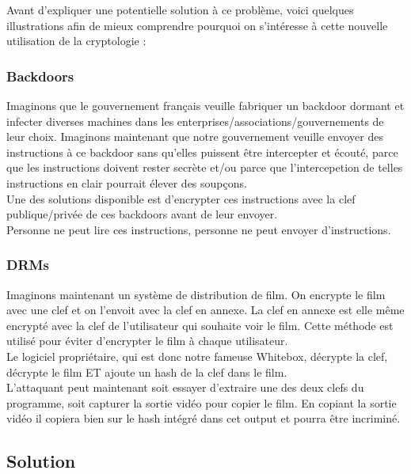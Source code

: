 \documentclass[a4paper,12pt]{article}
\begin{document}
Avant d'expliquer une potentielle solution à ce problème, voici quelques illustrations afin de mieux comprendre pourquoi on s'intéresse à cette nouvelle utilisation de la cryptologie :\\


\subsubsection{Backdoors}

Imaginons que le gouvernement français veuille fabriquer un backdoor dormant et infecter diverses machines dans les enterprises/associations/gouvernements de leur choix. Imaginons maintenant que notre gouvernement veuille envoyer des instructions à ce backdoor sans qu'elles puissent être intercepter et écouté, parce que les instructions doivent rester secrète et/ou parce que l'intercepetion de telles instructions en clair pourrait élever des soupçons.\\

Une des solutions disponible est d'encrypter ces instructions avec la clef publique/privée de ces backdoors avant de leur envoyer.\\

Personne ne peut lire ces instructions, personne ne peut envoyer d'instructions.


\subsubsection{DRMs}

Imaginons maintenant un système de distribution de film. On encrypte le film avec une clef et on l'envoit avec la clef en annexe. La clef en annexe est elle même encrypté avec la clef de l'utilisateur qui souhaite voir le film. Cette méthode est utilisé pour éviter d'encrypter le film à chaque utilisateur.\\
Le logiciel propriétaire, qui est donc notre fameuse Whitebox, décrypte la clef, décrypte le film ET ajoute un hash de la clef dans le film.\\
L'attaquant peut maintenant soit essayer d'extraire une des deux clefs du programme, soit capturer la sortie vidéo pour copier le film. En copiant la sortie vidéo il copiera bien sur le hash intégré dans cet output et pourra être incriminé.


\subsection{Solution}
\end{document}
